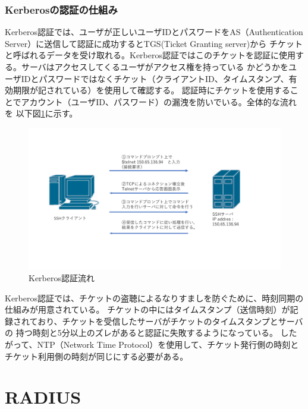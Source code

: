 \documentclass[11pt,a4j,titlepage]{jreport}
\begin{document}
\subsubsection*{Kerberosの認証の仕組み}
Kerberos認証では、ユーザが正しいユーザIDとパスワードをAS（Authentication Server）に送信して認証に成功するとTGS(Ticket Granting server)から
チケットと呼ばれるデータを受け取れる。Kerberos認証ではこのチケットを認証に使用する。サーバはアクセスしてくるユーザがアクセス権を持っている
かどうかをユーザIDとパスワードではなくチケット（クライアントID、タイムスタンプ、有効期限が記されている）を使用して確認する。
認証時にチケットを使用することでアカウント（ユーザID、パスワード）の漏洩を防いでいる。全体的な流れを
以下図\ref{KerberosAuthority}に示す。
\begin{figure}[h]
    \begin{flushleft}
        \includegraphics[width=1.0\textwidth, page=12]{graphs/network_archtecture.pdf}
        \caption{Kerberos認証流れ}
        \label{KerberosAuthority}
    \end{flushleft}
\end{figure}\par
Kerberos認証では、チケットの盗聴によるなりすましを防ぐために、時刻同期の仕組みが用意されている。
チケットの中にはタイムスタンプ（送信時刻）が記録されており、チケットを受信したサーバがチケットのタイムスタンプとサーバの
持つ時刻と5分以上のズレがあると認証に失敗するようになっている。
したがって、NTP（Network Time Protocol）を使用して、チケット発行側の時刻とチケット利用側の時刻が同じにする必要がある。
\clearpage

\section{RADIUS}
\end{document}
